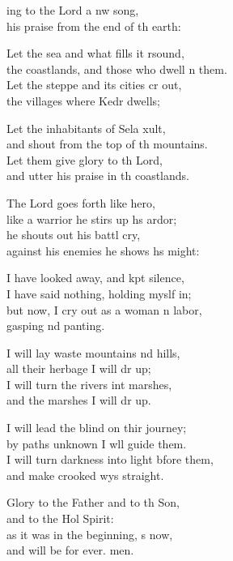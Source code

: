 \settowidth{\versewidth}{I will turn darkness into light before them, *}
\begin{psalmverse}%
  \begin{patverse}
ing to the Lord a nw song,\Med\\
his praise from the end of th earth:

Let the sea and what fills it rsound,\Med\\
the coastlands, and those who dwell \pointup{\i}n them.\\
Let the steppe and its cities cr out,\Med\\
the villages where Kedr dwells;

Let the inhabitants of Sela xult,\Med\\
and shout from the top of th mountains.\\
Let them give glory to th Lord,\Med\\
and utter his praise in th coastlands.

The Lord goes forth like  hero,\Med\\
like a warrior he stirs up h\pointup{\i}s ardor;\\
he shouts out his battl cry,\Med\\
against his enemies he shows h\pointup{\i}s might:

I have looked away, and kpt silence,\Med\\
I have said nothing, holding myslf in;\\
but now, I cry out as a woman \pointup{\i}n labor,\Med\\
gasping nd panting.

I will lay waste mountains nd hills,\Med\\
all their herbage I will dr up;\\
I will turn the rivers int marshes,\Med\\
and the marshes I will dr up.

I will lead the blind on thir journey;\Med\\
by paths unknown I w\pointup{\i}ll guide them.\\
I will turn darkness into light bfore them,\Med\\
and make crooked wys straight.

Glory to the Father and to th Son,\Med\\
    and to the Hol Spirit:\\
as it was in the beginning, \pointup{\i}s now,\Med\\
    and will be for ever. men.
  \end{patverse}
\end{psalmverse}
